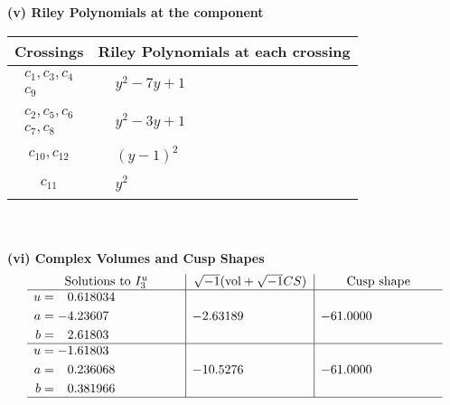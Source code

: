 \documentclass[1p]{elsarticle_modified}
\theoremstyle{definition}
\newcommand{\I}{\sqrt{-1}}
\begin{document}
\newpage\renewcommand{\arraystretch}{1}
\flushleft \textbf{(v) Riley Polynomials at the component}\newline \\
\begin{tabular}{m{50pt}|m{274pt}}
Crossings & \hspace{64pt}Riley Polynomials at each crossing \\
\hline $$\begin{aligned}c_{1},c_{3},c_{4}\\c_{9}\end{aligned}$$&$\begin{aligned}
&y^2-7 y+1
\end{aligned}$\\
\hline $$\begin{aligned}c_{2},c_{5},c_{6}\\c_{7},c_{8}\end{aligned}$$&$\begin{aligned}
&y^2-3 y+1
\end{aligned}$\\
\hline $$\begin{aligned}c_{10},c_{12}\end{aligned}$$&$\begin{aligned}
&(y-1)^2
\end{aligned}$\\
\hline $$\begin{aligned}c_{11}\end{aligned}$$&$\begin{aligned}
&y^2
\end{aligned}$\\
\hline
\end{tabular}\\~\\
\newpage\flushleft \textbf{(vi) Complex Volumes and Cusp Shapes}
$$\begin{array}{c|c|c}  
\text{Solutions to }I^u_{3}& \I (\text{vol} + \sqrt{-1}CS) & \text{Cusp shape}\\
 \hline 
\begin{aligned}
u &= \phantom{-}0.618034\phantom{ +0.000000I} \\
a &= -4.23607\phantom{ +0.000000I} \\
b &= \phantom{-}2.61803\phantom{ +0.000000I}\end{aligned}
 & -2.63189\phantom{ +0.000000I} & -61.0000\phantom{ +0.000000I} \\ \hline\begin{aligned}
u &= -1.61803\phantom{ +0.000000I} \\
a &= \phantom{-}0.236068\phantom{ +0.000000I} \\
b &= \phantom{-}0.381966\phantom{ +0.000000I}\end{aligned}
 & -10.5276\phantom{ +0.000000I} & -61.0000\phantom{ +0.000000I}\\
 \hline 
 \end{array}$$\newpage
\end{document}
